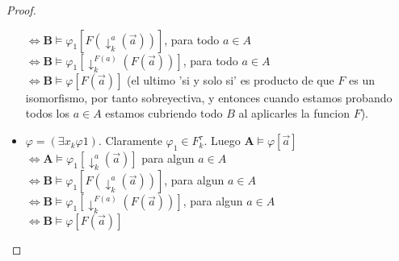 \begin{proof}
\begin{itemize}
    $\iff \mathbf{B}\models\varphi_1[F(\downarrow_k^a(\vec{a}))]$, para todo $a \in A$\\
    $\iff \mathbf{B}\models\varphi_1[\downarrow_k^{F(a)}(F(\vec{a}))]$, para todo $a \in A$\\
    $\iff \mathbf{B}\models\varphi[F(\vec{a})]$ (el ultimo 'si y solo si' es producto de que $F$ es un isomorfismo, por tanto sobreyectiva, y entonces cuando estamos probando todos los $a \in A$ estamos cubriendo todo $B$ al aplicarles la funcion $F$).
    \item $\varphi = (\exists x_k \varphi1)$. Claramente $\varphi_1 \in F_k^\tau$. Luego $\mathbf{A}\models\varphi[\vec{a}]$\\
    $\iff \mathbf{A}\models\varphi_1[\downarrow_k^a(\vec{a})]$ para algun $a \in A$\\
    $\iff \mathbf{B}\models\varphi_1[F(\downarrow_k^a(\vec{a}))]$, para algun $a \in A$\\
    $\iff \mathbf{B}\models\varphi_1[\downarrow_k^{F(a)}(F(\vec{a}))]$, para algun $a \in A$\\
    $\iff \mathbf{B}\models\varphi[F(\vec{a})]$
  \end{itemize}

\end{proof} 
